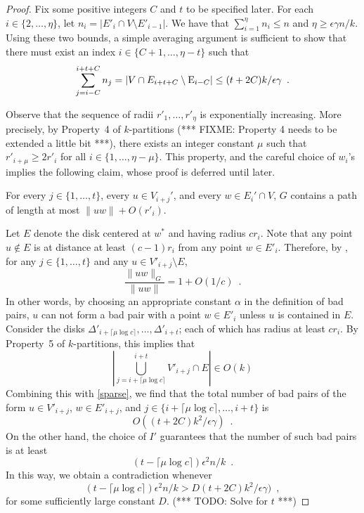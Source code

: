 \documentclass{patmorin}
\begin{document}
\begin{proof}
  Fix some positive integers $C$ and $t$ to be specified later.  For each
  $i\in\{2,\ldots,\eta\}$, let $n_i=|E'_i\cap V\setminus E'_{i-1}|$. We
  have that $\sum_{i=1}^{\eta} n_i \le n$ and $\eta\ge \epsilon\gamma n/k$.
  Using these two bounds, a simple averaging argument is sufficient
  to show that there must exist an index $i\in\{C+1,\ldots,\eta-t\}$
  such that
  \begin{equation}
     \sum_{j=i-C}^{i+t+C} n_j 
        = |V\cap E_{i+t+C}\setminus \E_{i-C}| 
          \le (t+2C)k/\epsilon\gamma \enspace . \eqlabel{sparse}
  \end{equation}

  Observe that the sequence of radii $r'_1,\ldots,r'_{\eta}$
  is exponentially increasing.  More precisely, by Property~4 of
  $k$-partitions (*** FIXME: Property 4 needs to be extended a little bit ***),
  there exists an integer constant $\mu$ such that $r'_{i+\mu} \ge 2r'_i$
  for all $i\in\{1,\ldots,\eta-\mu\}$.  This property, and the careful
  choice of $w_i$'s implies the following claim, whose proof is deferred
  until later.
  \begin{clm}
    For every $j\in\{1,\ldots,t\}$, every $u\in V_{i+j}'$, and every $w\in
    E_i'\cap V$, $G$ contains a path of length at most $\|uw\|+O(r'_i)$.
  \end{clm}

  Let $E$ denote the disk centered at $w^*$ and having radius $cr_i$.
  Note that any point $u\not\in E$ is at distance at least $(c-1)r_i$
  from any point $w\in E'_i$.  Therefore, by , for any
  $j\in\{1,\ldots,t\}$ and any $u\in V'_{i+j}\setminus E$,
  \[  
     \frac{\|uw\|_G}{\|uw\|} = 1+O(1/c) \enspace . 
  \]
  In other words, by choosing an appropriate constant $\alpha$ in the
  definition of bad pairs, $u$ can not form a bad pair with a point
  $w\in E'_i$ unless $u$ is contained in $E$.  Consider the disks
  $\Delta'_{i+\lceil\mu\log c\rceil},\ldots,\Delta'_{i+t}$; each of
  which has radius at least $cr_i$.  By Property~5 of $k$-partitions,
  this implies that
  \[
    \left|\bigcup_{j=i+\lceil\mu\log c\rceil}^{i+t} V'_{i+j}\cap E\right|
      \in O(k)
  \]
  Combining this with \eqref{sparse}, we find that the total number
  of bad pairs of the form $u\in V'_{i+j}$, $w\in E'_{i+j}$, and
  $j\in\{i+\lceil\mu\log c\rceil,\ldots,i+t\}$ is
  \[
     O((t+2C)k^2/\epsilon\gamma) \enspace .
  \]
  On the other hand, the choice of $I'$ guarantees that the number of
  such bad pairs is at least 
  \[
     (t-\lceil\mu\log c\rceil)\epsilon^2n/k \enspace .
  \]
  In this way, we obtain a contradiction whenever 
  \[
     (t-\lceil\mu\log c\rceil)\epsilon^2n/k > D(t+2C)k^2/\epsilon\gamma) \enspace ,
  \]
  for some sufficiently large constant $D$.  (*** TODO: Solve for $t$ ***)


\end{proof}
\end{document}
